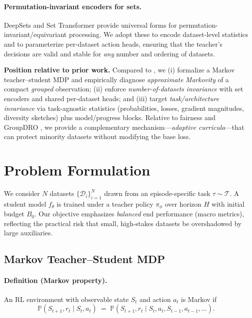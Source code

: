 \documentclass[11pt]{article}
\newcommand{\1}{\mathbf{1}}
\newcommand{\Prb}{\mathbb{P}}
\begin{document}
\paragraph{Permutation-invariant encoders for sets.}
DeepSets \citep{zaheer2017deepsets} and Set Transformer \citep{lee2019settransformer} provide universal forms for permutation-invariant/equivariant processing. We adopt these to encode dataset-level statistics and to parameterize per-dataset action heads, ensuring that the teacher’s decisions are valid and stable for \emph{any} number and ordering of datasets.

\medskip
\noindent\textbf{Position relative to prior work.}
Compared to \citet{fan2018l2t,wu2018l2tloss}, we (i) formalize a Markov teacher--student MDP and empirically diagnose \emph{approximate Markovity} of a compact \emph{grouped} observation; (ii) enforce \emph{number-of-datasets invariance} with set encoders and shared per-dataset heads; and (iii) target \emph{task/architecture invariance} via task-agnostic statistics (probabilities, losses, gradient magnitudes, diversity sketches) plus model/progress blocks. Relative to fairness and GroupDRO \citep{hashimoto2018fairness,sagawa2020dro}, we provide a complementary mechanism—\emph{adaptive curricula}—that can protect minority datasets without modifying the base loss.

\section{Problem Formulation}
We consider $N$ datasets $\{\mathcal{D}_i\}_{i=1}^N$ drawn from an episode-specific task $\tau\sim\mathcal{T}$. A student model $f_\theta$ is trained under a teacher policy $\pi_\phi$ over horizon $H$ with initial budget $B_0$. Our objective emphasizes \emph{balanced} end performance (macro metrics), reflecting the practical risk that small, high-stakes datasets be overshadowed by large auxiliaries.

\subsection{Markov Teacher--Student MDP}\label{sec:mdp}
\paragraph{Definition (Markov property).}
An RL environment with observable state $S_t$ and action $a_t$ is Markov if
\begin{equation}
\Prb(S_{t+1},r_t \mid S_t,a_t) \;=\; \Prb(S_{t+1},r_t \mid S_t,a_t,S_{t-1},a_{t-1},\dots).
\label{eq:markov}
\end{equation}
\end{document}
